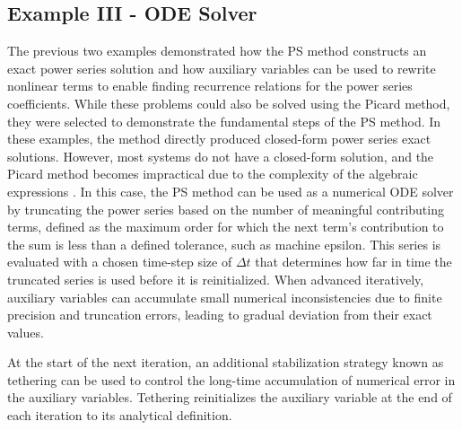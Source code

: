 \documentclass{article}
\begin{document}
\subsection{Example III - ODE Solver}\label{Intro: ExIII}
The previous two examples demonstrated how the PS method constructs an exact power series solution and how auxiliary variables can be used to rewrite nonlinear terms to enable finding recurrence relations for the power series coefficients. While these problems could also be solved using the Picard method, they were selected to demonstrate the fundamental steps of the PS method. In these examples, the method directly produced closed-form power series exact solutions. However, most systems do not have a closed-form solution, and the Picard method becomes impractical due to the complexity of the algebraic expressions \cite{Ansari2024, Leal2015, Rudmin1998}. In this case, the PS method can be used as a numerical ODE solver by truncating the power series based on the number of meaningful contributing terms, defined as the maximum order for which the next term’s contribution to the sum is less than a defined tolerance, such as machine epsilon. This series is evaluated with a chosen time-step size of $\Delta t$ that determines how far in time the truncated series is used before it is reinitialized. When advanced iteratively, auxiliary variables can accumulate small numerical inconsistencies due to finite precision and truncation errors, leading to gradual deviation from their exact values. 

At the start of the next iteration, an additional stabilization strategy known as tethering \cite{Stewart2009} can be used to control the long-time accumulation of numerical error in the auxiliary variables. Tethering reinitializes the auxiliary variable at the end of each iteration to its analytical definition.
\end{document}
